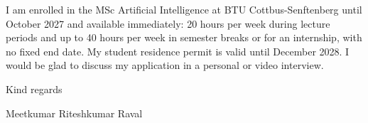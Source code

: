 \documentclass[a4paper,11pt]{article}
\begin{document}
I am enrolled in the MSc Artificial Intelligence at BTU Cottbus-Senftenberg until October 2027 and available immediately: 20 hours per week during lecture periods and up to 40 hours per week in semester breaks or for an internship, with no fixed end date. My student residence permit is valid until December 2028. I would be glad to discuss my application in a personal or video interview.

\vspace{1.2em}

Kind regards

\vspace{1.6em}

Meetkumar Riteshkumar Raval
\end{document}
